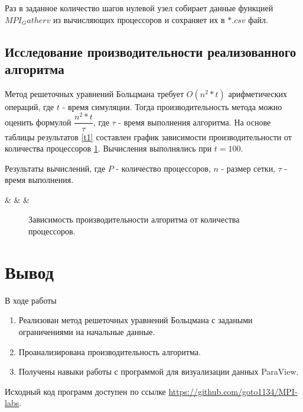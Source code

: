			Раз в заданное количество шагов нулевой узел собирает данные функцией $ MPI_Gatherv $ из вычисляющих процессоров и сохраняет их в $ *.csv $ файл. 
			
		\subsection{Исследование производительности реализованного алгоритма}
			
			Метод решеточных уравнений Больцмана требует $ O(n^2 * t) $ арифметических операций, где $ t $ - время симуляции. Тогда производительность метода можно оценить формулой $  \dfrac{n^2 * t}{\tau} $, где $ \tau $ - время выполнения алгоритма. На основе таблицы результатов \ref{t1} составлен график зависимости производительности от количества процессоров \ref{fig:performance}. Вычисления выполнялись при $ t=100 $.
			
			\clearpage	
		
			\begin{table}
				\centering
				\caption{Результаты вычислений, где $ P $ - количество процессоров, $ n $ - размер сетки, $ \tau $ - время выполнения.}
				\label{t1}
				{\thecsvrow & \pnumber& \n & \ftime }%
			\end{table}
		
			\begin{figure}
				\centering
				\caption{Зависимость производительности алгоритма от количества процессоров.} \label{fig:performance}
			\end{figure}
	
	\FloatBarrier
	\clearpage	
	\section{Вывод}
		В ходе работы
		\begin{enumerate}
			\item Реализован метод решеточных уравнений Больцмана с задаными ограничениями на начальные данные.
			\item Проанализирована производительность алгоритма.
			\item Получены навыки работы с программой для визуализации данных ParaView.
		\end{enumerate}
	
		Исходный код программ доступен по ссылке \href{https://github.com/goto1134/MPI-labs}{https://github.com/goto1134/MPI-labs}.